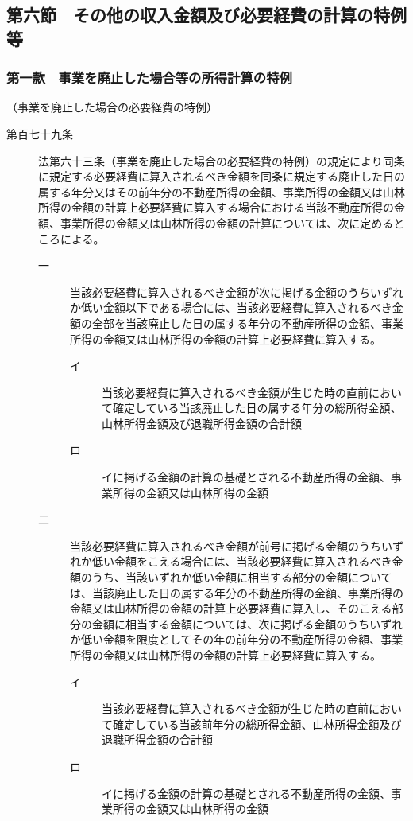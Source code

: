 \documentclass[twocolumn,a4j,10pt]{ltjtarticle}
\begin{document}
\subsection*{第六節　その他の収入金額及び必要経費の計算の特例等}
\subsubsection*{第一款　事業を廃止した場合等の所得計算の特例}
\noindent\hspace{10pt}（事業を廃止した場合の必要経費の特例）
\begin{description}
\item[第百七十九条]法第六十三条（事業を廃止した場合の必要経費の特例）の規定により同条に規定する必要経費に算入されるべき金額を同条に規定する廃止した日の属する年分又はその前年分の不動産所得の金額、事業所得の金額又は山林所得の金額の計算上必要経費に算入する場合における当該不動産所得の金額、事業所得の金額又は山林所得の金額の計算については、次に定めるところによる。
\begin{description}
\item[一]当該必要経費に算入されるべき金額が次に掲げる金額のうちいずれか低い金額以下である場合には、当該必要経費に算入されるべき金額の全部を当該廃止した日の属する年分の不動産所得の金額、事業所得の金額又は山林所得の金額の計算上必要経費に算入する。
\begin{description}
\item[イ]当該必要経費に算入されるべき金額が生じた時の直前において確定している当該廃止した日の属する年分の総所得金額、山林所得金額及び退職所得金額の合計額
\item[ロ]イに掲げる金額の計算の基礎とされる不動産所得の金額、事業所得の金額又は山林所得の金額
\end{description}
\item[二]当該必要経費に算入されるべき金額が前号に掲げる金額のうちいずれか低い金額をこえる場合には、当該必要経費に算入されるべき金額のうち、当該いずれか低い金額に相当する部分の金額については、当該廃止した日の属する年分の不動産所得の金額、事業所得の金額又は山林所得の金額の計算上必要経費に算入し、そのこえる部分の金額に相当する金額については、次に掲げる金額のうちいずれか低い金額を限度としてその年の前年分の不動産所得の金額、事業所得の金額又は山林所得の金額の計算上必要経費に算入する。
\begin{description}
\item[イ]当該必要経費に算入されるべき金額が生じた時の直前において確定している当該前年分の総所得金額、山林所得金額及び退職所得金額の合計額
\item[ロ]イに掲げる金額の計算の基礎とされる不動産所得の金額、事業所得の金額又は山林所得の金額
\end{description}
\end{description}
\end{description}
\end{document}
